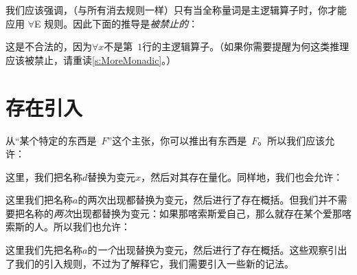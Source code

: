 我们应该强调，（与所有消去规则一样）只有当全称量词是主逻辑算子时，你才能应用 $\forall$E 规则。因此下面的推导是\emph{被禁止的}：


\begin{fitchproof}
	\PR
\end{fitchproof}


这是不合法的，因为$\forall x$不是第~$1$行的主逻辑算子。（如果你需要提醒为何这类推理应该被禁止，请重读\cref{s:MoreMonadic}。）

\section{存在引入}\label{s:existsIntro}

从“某个特定的东西是~$F$”这个主张，你可以推出有东西是~$F$。所以我们应该允许：


\begin{fitchproof}
	\PR
	 
\end{fitchproof}


这里，我们把名称$d$替换为变元$x$，然后对其存在量化。同样地，我们也会允许：


\begin{fitchproof}
	\PR
	 
\end{fitchproof}


这里我们把名称$a$的两次出现都替换为变元，然后进行了存在概括。但我们并不需要把名称的\emph{两次}出现都替换为变元：如果那喀索斯爱自己，那么就存在某个爱那喀索斯的人。所以我们也允许：


\begin{fitchproof}
	\PR
	 
\end{fitchproof}


这里我们先把名称$a$的\emph{一个}出现替换为变元，然后进行了存在概括。这些观察引出了我们的引入规则，不过为了解释它，我们需要引入一些新的记法。

